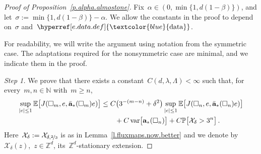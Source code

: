 \documentclass[11pt,twoside]{article} %
\let\oldsquare\square %
\renewcommand{\square}{\oldsquare}
\numberwithin{equation}{section}
\theoremstyle{definition}
\newcommand{\dataref}{\hyperref[e.data.def]{\textcolor{blue}{\ensuremath{\mathrm{data}}}}}
\newcommand*{\N}{\ensuremath{\mathbb{N}}}
\newcommand*{\Zd}{\ensuremath{\mathbb{Z}^d}}
\renewcommand{\a}{\mathbf{a}}
\newcommand{\ahom}{\bar{\a}}
\newcommand{\cu}{\square}
\renewcommand{\P}{\mathbb{P}}
\newcommand{\E}{\mathbb{E}}
\newcommand{\X}{\mathcal{X}}
\DeclareMathOperator{\var}{var}
\begin{document}
\begin{proof}[{Proof of Proposition~\ref{p.alpha.almostone}}]
Fix~$\alpha \in (0 , \min\{ 1, d(1-\beta) \})$, and let~$\sigma := \min\{ 1, d(1-\beta) \} - \alpha$. We allow the constants in the proof to depend on~$\sigma$ and~$\dataref$.

\smallskip

For readability, we will write the argument using notation from the symmetric case. The adaptations required for the nonsymmetric case are minimal, and we indicate them in the proof. 

\smallskip

\emph{Step 1.} We prove that there exists a constant~$C(d,\lambda,\Lambda)<\infty$ such that, for every~$m,n \in \N$ with~$m \geq n$,
\begin{align} 
\label{e.baby.optimal.iter.basic}
\sup_{|e| \leq 1} \E\bigl[ J(\cu_m, e, \ahom_*(\cu_m) e ) \bigr]
&
\leq 
C  \bigl( 3^{-(m-n)} + \delta^2 \bigr)  \sup_{|e| \leq 1} \E\bigl[ J(\cu_n, e, \ahom_*(\cu_n) e )\bigr]
\notag \\ & \qquad  + C \var\bigl[\a_*(\cu_n)\bigr] + C \P\bigl[\X_\delta > 3^n \bigr]
 \,.
\end{align}
Here~$\X_\delta := \X_{\delta,\nicefrac23}$ is as in Lemma~\ref{l.fluxmaps.now.better} and we denote by~$\X_\delta(z)$,~$z \in \Zd$, its~$\Zd$-stationary extension. 

\smallskip


\end{proof}
\end{document}
